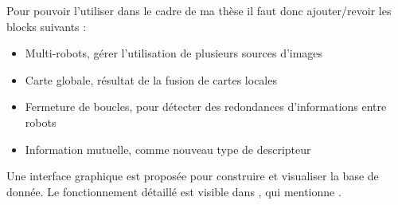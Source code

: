 Pour pouvoir l'utiliser dans le cadre de ma thèse il faut donc ajouter/revoir les blocks suivants :
\begin{itemize}
\item Multi-robots, gérer l'utilisation de plusieurs sources d'images
\item Carte globale, résultat de la fusion de cartes locales
\item Fermeture de boucles, pour détecter des redondances d'informations entre robots
\item Information mutuelle, comme nouveau type de descripteur
\end{itemize}


Une interface graphique est proposée pour construire et visualiser la base de donnée.
Le fonctionnement détaillé est visible dans \cite{Lequievre08}, qui mentionne .
